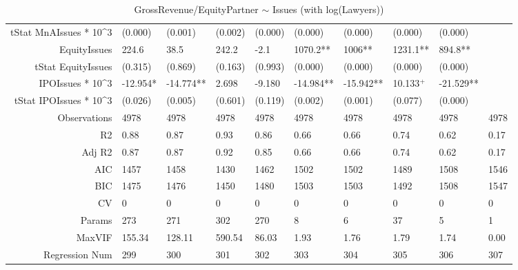 \begin{table}[ht]
\begin{tabular}{rlllllllll}
  tStat MnAIssues * 10^3 & (0.000) & (0.001) & (0.002) & (0.000) & (0.000) & (0.000) & (0.000) & (0.000) &  \\ 
  EquityIssues & 224.6 & 38.5 & 242.2 & -2.1 & 1070.2** & 1006** & 1231.1** & 894.8** &  \\ 
  tStat EquityIssues & (0.315) & (0.869) & (0.163) & (0.993) & (0.000) & (0.000) & (0.000) & (0.000) &  \\ 
  IPOIssues * 10^3 & -12.954* & -14.774** & 2.698 & -9.180 & -14.984** & -15.942** & 10.133$^{+}$ & -21.529** &  \\ 
  tStat IPOIssues * 10^3 & (0.026) & (0.005) & (0.601) & (0.119) & (0.002) & (0.001) & (0.077) & (0.000) &  \\ 
  Observations & 4978 & 4978 & 4978 & 4978 & 4978 & 4978 & 4978 & 4978 & 4978 \\ 
  R2 & 0.88 & 0.87 & 0.93 & 0.86 & 0.66 & 0.66 & 0.74 & 0.62 & 0.17 \\ 
  Adj R2 & 0.87 & 0.87 & 0.92 & 0.85 & 0.66 & 0.66 & 0.74 & 0.62 & 0.17 \\ 
  AIC & 1457 & 1458 & 1430 & 1462 & 1502 & 1502 & 1489 & 1508 & 1546 \\ 
  BIC & 1475 & 1476 & 1450 & 1480 & 1503 & 1503 & 1492 & 1508 & 1547 \\ 
  CV & 0 & 0 & 0 & 0 & 0 & 0 & 0 & 0 & 0 \\ 
  Params & 273 & 271 & 302 & 270 & 8 & 6 & 37 & 5 & 1 \\ 
  MaxVIF & 155.34 & 128.11 & 590.54 & 86.03 & 1.93 & 1.76 & 1.79 & 1.74 & 0.00 \\ 
  Regression Num & 299 & 300 & 301 & 302 & 303 & 304 & 305 & 306 & 307 \\ 
   \hline
\end{tabular}
\caption{GrossRevenue/EquityPartner $\sim$ Issues (with log(Lawyers))} 
\end{table}
